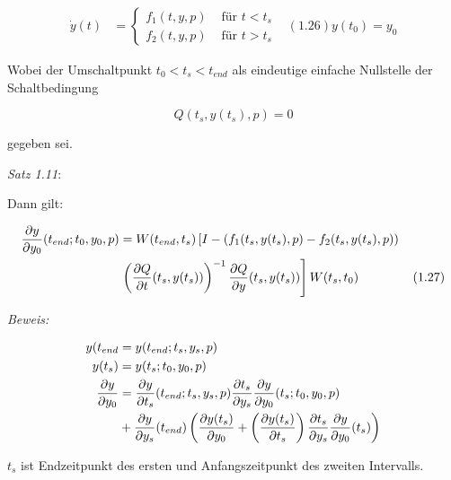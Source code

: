 \begin{align*}
\dot y(t) &= \begin{cases} f_1(t,y,p) & \text{ für } t < t_s \\ f_2(t,y,p) & \text{ für } t > t_s \end{cases} & (1.26)
y(t_0) = y_0
\end{align*}

Wobei der Umschaltpunkt $t_0 < t_s < t_{end}$ als eindeutige einfache Nullstelle der Schaltbedingung

\[ Q(t_s,y(t_s),p) = 0 \]

gegeben sei.

\emph{Satz 1.11}:

Dann gilt:

\begin{align*}
\frac{\partial y}{\partial y_0} (t_{end}; t_0,y_0,p) &= W(t_{end},t_s) \left[I-(f_1(t_s,y(t_s),p)-f_2(t_s,y(t_s),p)) \right. \\ 
& \left.\left( \frac{\partial Q}{\partial t} (t_s,y(t_s))\right)^{-1} \frac{\partial Q}{\partial y}(t_s,y(t_s)) \right] W(t_s,t_0) & (1.27) \\
\end{align*}

\emph{Beweis:}

\begin{align*}
y(t_{end} &= y(t_{end}; t_s,y_s,p) \\
y(t_s) &= y(t_s; t_0,y_0,p) \\
\frac{\partial y}{\partial y_0} &= \frac{\partial y}{\partial t_s} (t_{end}; t_s,y_s,p) \frac{\partial t_s}{\partial y_s} \frac{\partial y}{\partial y_0} (t_s; t_0,y_0,p) \\
&+ \frac{\partial y}{\partial y_s}(t_{end}) \left( \frac{\partial y(t_s)}{\partial y_0} + \left( \frac{\partial y(t_s)}{\partial t_s} \right) \frac{\partial t_s}{\partial y_s} \frac{\partial y}{\partial y_0}(t_s) \right) \\
\end{align*}

$t_s$ ist Endzeitpunkt des ersten und Anfangszeitpunkt des zweiten Intervalls.

